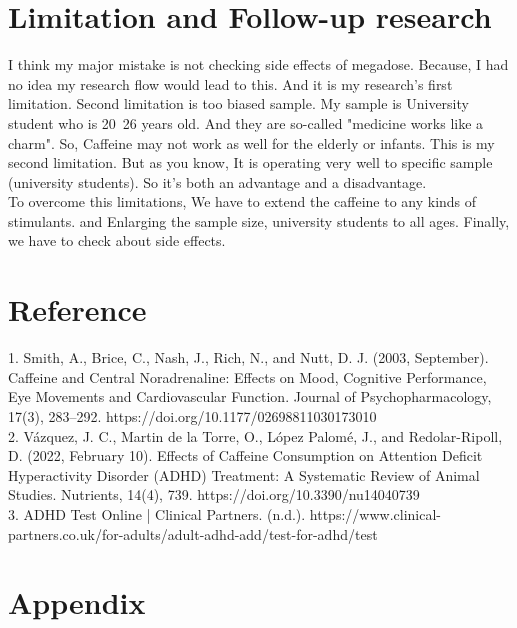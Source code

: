 \documentclass[12pt]{article}
\begin{document}
\section{Limitation and Follow-up research}
\quad I think my major mistake is not checking side effects of megadose. Because, I had no idea my research flow would lead to this. And it is my research's first limitation. Second limitation is too biased sample. My sample is University student who is 20~26 years old. And they are so-called "medicine works like a charm". So, Caffeine may not work as well for the elderly or infants. This is my second limitation. But as you know, It is operating very well to specific sample (university students). So it's both an advantage and a disadvantage.
\\
\quad To overcome this limitations, We have to extend the caffeine to any kinds of stimulants.
and Enlarging the sample size, university students to all ages. 
Finally, we have to check about side effects.

\section{Reference}
1. Smith, A., Brice, C., Nash, J., Rich, N., and Nutt, D. J. (2003, September). Caffeine and Central Noradrenaline: Effects on Mood, Cognitive Performance, Eye Movements and Cardiovascular Function. Journal of Psychopharmacology, 17(3), 283–292. https://doi.org/10.1177/02698811030173010 \\
2. Vázquez, J. C., Martin de la Torre, O., López Palomé, J., and Redolar-Ripoll, D. (2022, February 10). Effects of Caffeine Consumption on Attention Deficit Hyperactivity Disorder (ADHD) Treatment: A Systematic Review of Animal Studies. Nutrients, 14(4), 739. https://doi.org/10.3390/nu14040739\\
3. ADHD Test Online | Clinical Partners. (n.d.). https://www.clinical-partners.co.uk/for-adults/adult-adhd-add/test-for-adhd/test

\newpage
\section{Appendix}
\end{document}
